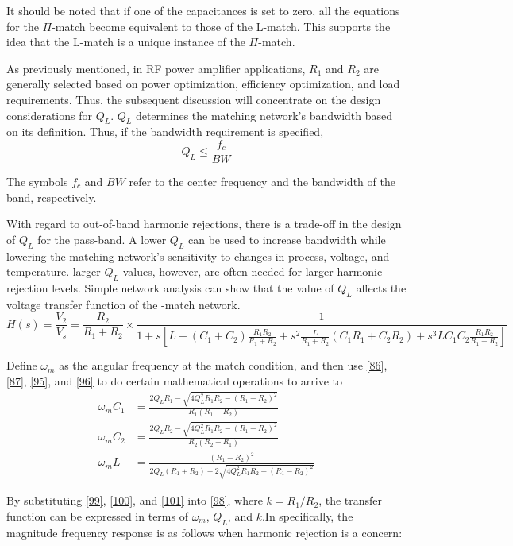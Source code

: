 It should be noted that if one of the capacitances is set to zero, all the equations for the $\Pi$-match become equivalent to those of the L-match. This supports the idea that the L-match is a unique instance of the $\Pi$-match.

As previously mentioned, in RF power amplifier applications, $R_1$ and $R_2$ are generally selected based on power optimization, efficiency optimization, and load requirements. Thus, the subsequent discussion will concentrate on the design considerations for $Q_L$. $Q_L$ determines the matching network's bandwidth based on its definition. Thus, if the bandwidth requirement is specified,
\begin{equation}
    Q_L \leq \frac{f_c}{BW}\label{97}
\end{equation}

The symbols $f_c$ and $BW$ refer to the center frequency and the bandwidth of the band, respectively.

With regard to out-of-band harmonic rejections, there is a trade-off in the design of $Q_L$ for the pass-band. A lower $Q_L$ can be used to increase bandwidth while lowering the matching network's sensitivity to changes in process, voltage, and temperature. larger $Q_L$ values, however, are often needed for larger harmonic rejection levels. Simple network analysis can show that the value of $Q_L$ affects the voltage transfer function of the -match network.
\begin{equation}
    H(s)=\frac{V_2}{V_s}=\frac{R_2}{R_1+R_2}\times\frac{1}{1+s\left[L+\left(C_1+C_2\right)\frac{R_1R_2}{R_1+R_2}+s^2\frac{L}{R_1+R_2}\left(C_1R_1+C_2R_2\right)+s^3LC_1C_2\frac{R_1R_2}{R_1+R_2}\right]}\label{98}
\end{equation}

Define $\omega_m$ as the angular frequency at the match condition, and then use \eqref{86}, \eqref{87}, \eqref{95}, and \eqref{96} to do certain mathematical operations to arrive to
\begin{align}
    \omega_mC_1 &=\frac{2Q_LR_1-\sqrt{4Q_L^2R_1R_2-\left(R_1-R_2\right)^2}}{R_1\left(R_1-R_2\right)}\label{99}\\
    \omega_mC_2 &=\frac{2Q_LR_2-\sqrt{4Q_L^2R_1R_2-\left(R_1-R_2\right)^2}}{R_2\left(R_2-R_1\right)}\label{100}\\
    \omega_mL&=\frac{\left(R_1-R_2\right)^2}{2Q_L\left(R_1+R_2\right)-2\sqrt{4Q_L^2R_1R_2-\left(R_1-R_2\right)^2}}\label{101}
\end{align}

By substituting \eqref{99}, \eqref{100}, and \eqref{101} into \eqref{98}, where $k = R_1/R_2$, the transfer function can be expressed in terms of $\omega_m$, $Q_L$, and $k$.In specifically, the magnitude frequency response is as follows when harmonic rejection is a concern:

